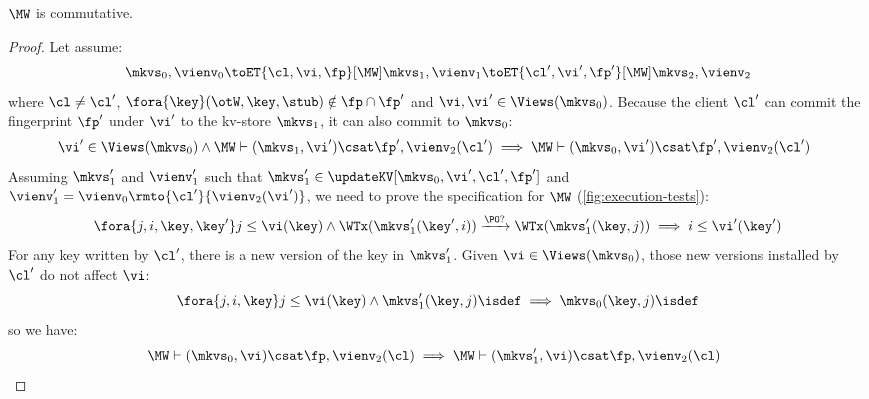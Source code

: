 \begin{lemma}
    \label{lem:mw-comm}
    \(\MW\) is commutative.
\end{lemma}
\begin{proof}
    Let assume:
    \[
        \mkvs_0, \vienv_0 \toET{\cl, \vi, \fp}[\MW] \mkvs_1, \vienv_1 \toET{\cl', \vi', \fp'}[\MW] \mkvs_2, \vienv_2 
    \]
    where \( \cl \neq \cl' \), \( \fora{ \key } (\otW, \key, \stub) \notin \fp \cap \fp' \) and \( \vi, \vi' \in \Views(\mkvs_0)\).
    Because the client \( \cl' \) can commit the fingerprint \( \fp' \) under \( \vi' \) to the kv-store \( \mkvs_1 \), it can also commit to \( \mkvs_0 \):
    \[
        \begin{array}{@{}l}
            \vi' \in \Views(\mkvs_0) \land \MW \vdash (\mkvs_1, \vi') \csat \fp', \vienv_2(\cl') \implies  \MW \vdash (\mkvs_0, \vi') \csat \fp', \vienv_2(\cl')
        \end{array}
    \]
    Assuming \( \mkvs'_1 \) and \( \vienv'_1 \) such that \( \mkvs'_1 \in \updateKV[\mkvs_0,\vi',\cl',\fp'] \) and \( \vienv'_1 = \vienv_0\rmto{\cl'}{\vienv_2(\vi')} \), we need to prove the specification for \( \MW \) (\cref{fig:execution-tests}):
    \[
        \fora{j,i, \key, \key'} j \leq \vi(\key) \wedge \WTx(\mkvs'_1(\key', i)) \xrightarrow{\PO ?} \WTx(\mkvs'_1(\key, j)) \implies i \leq \vi'(\key')  \\
    \]
    For any key written by \( \cl' \), there is a new version of the key in \( \mkvs'_1 \).
    Given \( \vi \in \Views(\mkvs_0)\), those new versions installed by \( \cl' \) do not affect \( \vi \):
    \[
        \fora{j,i, \key} j \leq \vi(\key) \land \mkvs'_1(\key, j)\isdef \implies \mkvs_0(\key, j)\isdef
    \]
    so we have:
    \[
        \begin{array}{@{}l}
            \MW \vdash (\mkvs_0, \vi) \csat \fp, \vienv_2(\cl) \implies  \MW \vdash (\mkvs'_1, \vi) \csat \fp, \vienv_2(\cl)
        \end{array}
    \]
\end{proof}


